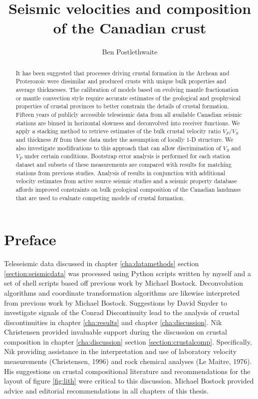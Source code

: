 \documentclass[msc,oneside]{ubcthesis}
\title{Seismic velocities and composition of the Canadian crust}
\author{Ben Postlethwaite}
\begin{document}
\frontmatter

\maketitle                      %
\begin{abstract}                %
  It has been suggested that processes driving crustal formation in the Archean and Proterozoic were dissimilar and produced crusts with unique bulk properties and average thicknesses. The calibration of models based on evolving mantle fractionation or mantle convection style require accurate estimates of the geological and geophysical properties of crustal provinces to better constrain the details of crustal formation. Fifteen years of publicly accessible teleseismic data from all available Canadian seismic stations are binned in horizontal slowness and deconvolved into receiver functions. We apply a stacking method to retrieve estimates of the bulk crustal velocity ratio $V_P/V_S$ and thickness $H$ from these data under the assumption of locally 1-D structure. We also investigate modifications to this approach that can allow discrimination of $V_S$ and $V_P$ under certain conditions. Bootstrap error analysis is performed for each station dataset and subsets of these measurements are compared with results for matching stations from previous studies. Analysis of results in conjunction with additional velocity estimates from active source seismic studies and a seismic property database affords improved constraints on bulk geological composition of the Canadian landmass that are used to evaluate competing models of crustal formation.
\end{abstract}

\chapter{Preface}

Teleseismic data discussed in chapter \ref{cha:datamethods} section \ref{section:seismicdata} was processed using Python scripts written by myself and a set of shell scripts based off previous work by Michael Bostock. Deconvolution algorithms and coordinate transformation algorithms are likewise interpreted from previous work by Michael Bostock. Suggestions by David Snyder to investigate signals of the Conrad Discontinuity lead to the analysis of crustal discontinuities in chapter \ref{cha:results} and chapter \ref{cha:discussion}. Nik Christensen provided invaluable support during the discussion on crustal composition in chapter \ref{cha:discussion} section \ref{section:crustalcomp}. Specifically, Nik providing assistance in the interpretation and use of laboratory velocity measurements (Christensen, 1996) and rock chemical analyses (Le Maitre, 1976). His suggestions on crustal compositional literature and recommendations for the layout of figure \ref{fig:lith} were critical to this discussion. Michael Bostock provided advice and editorial recommendations in all chapters of this thesis.
\end{document}

